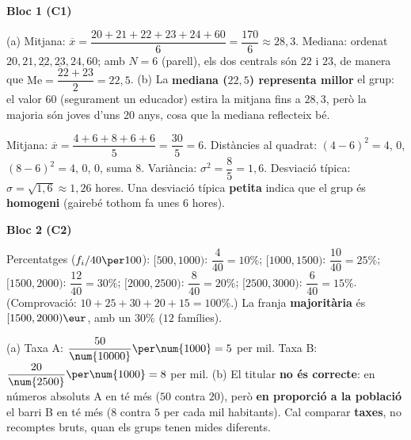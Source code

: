 \newpage
\begin{solucions}

\noindent\textbf{Bloc 1 (C1)}
\begin{sollist}
  \item (a) Mitjana: $\overline{x}=\dfrac{20+21+22+23+24+60}{6}=\dfrac{170}{6}\approx 28,3$.
        Mediana: ordenat $20,21,\underline{22},\underline{23},24,60$; amb $N=6$
        (parell), els dos centrals són $22$ i $23$, de manera que
        $\text{Me}=\dfrac{22+23}{2}=22,5$. \quad
        (b) La \textbf{mediana ($22,5$) representa millor} el grup: el valor $60$
        (segurament un educador) estira la mitjana fins a $28,3$, però la majoria són
        joves d'uns $20$ anys, cosa que la mediana reflecteix bé.
  \item Mitjana: $\overline{x}=\dfrac{4+6+8+6+6}{5}=\dfrac{30}{5}=6$. Distàncies al
        quadrat: $(4-6)^2=4$, $0$, $(8-6)^2=4$, $0$, $0$, suma $8$. Variància:
        $\sigma^2=\dfrac{8}{5}=1,6$. Desviació típica: $\sigma=\sqrt{1,6}\approx 1,26$
        hores. Una desviació típica \textbf{petita} indica que el grup és
        \textbf{homogeni} (gairebé tothom fa unes $6$ hores).
\end{sollist}

\noindent\textbf{Bloc 2 (C2)}
\begin{sollist}\setcounter{enumi}{2}
  \item Percentatges ($f_i/40\per 100$): $[500,1000)$: $\dfrac{4}{40}=10\%$;
        $[1000,1500)$: $\dfrac{10}{40}=25\%$; $[1500,2000)$: $\dfrac{12}{40}=30\%$;
        $[2000,2500)$: $\dfrac{8}{40}=20\%$; $[2500,3000)$: $\dfrac{6}{40}=15\%$.
        (Comprovació: $10+25+30+20+15=100\%$.) La franja \textbf{majoritària} és
        $[1500,2000)\eur$, amb un $30\%$ ($12$ famílies).
  \item (a) Taxa A: $\dfrac{50}{\num{10000}}\per\num{1000}=5$ per mil. Taxa B:
        $\dfrac{20}{\num{2500}}\per\num{1000}=8$ per mil. \quad
        (b) El titular \textbf{no és correcte}: en números absoluts A en té més ($50$
        contra $20$), però \textbf{en proporció a la població} el barri B en té més
        ($8$ contra $5$ per cada mil habitants). Cal comparar \textbf{taxes}, no
        recomptes bruts, quan els grups tenen mides diferents.
\end{sollist}


\end{solucions}
